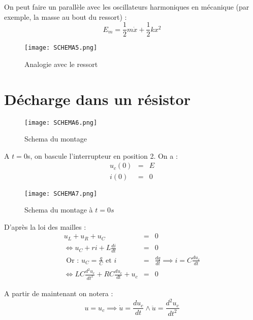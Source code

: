 \begin{remark}
    On peut faire un parallèle avec les oscillateurs harmoniques en mécanique (par exemple, la masse au bout du ressort) : \\
    \[
        E_{m} = \frac{1}{2}m \dot{x} + \frac{1}{2}kx^{2}
    \]
\end{remark}

\begin{figure}[!htb]
    \centering
    \texttt{[image: SCHEMA5.png]}
    \caption{Analogie avec le ressort}
    \label{fig:SCHEMA5}
\end{figure}


\section{Décharge dans un résistor}

\begin{figure}[!htb]
    \centering
    \texttt{[image: SCHEMA6.png]}
    \caption{Schema du montage}
    \label{fig:SCHEMA6}
\end{figure}


A \(t  =0\)s, on bascule l'interrupteur en position 2. On a : 
\begin{eqnarray*}
    u_{c}(0) &=& E \\
    i(0) &=& 0
\end{eqnarray*}

\begin{figure}[!htb]
    \centering
    \texttt{[image: SCHEMA7.png]}
    \caption{Schema du montage à \(t = 0 \unit{s}\) }
    \label{fig:SCHEMA7}
\end{figure}


D'après la loi des mailles : 
\begin{eqnarray*}
    u_{L} + u_{R} + u_{C} &=& 0 \\
    \iff u_{C} + ri + L \frac{di}{dt} &=& 0 \\
    \text{ Or :  } u_{C} = \frac{q}{C} \text{ et } i &=& \frac{dq}{dt} \implies  i = C \frac{du_{c}}{dt} \\
    \iff LC \frac{d^{2}u_{c}}{dt^{2}} + RC \frac{du_{c}}{dt} + u_{c} &=& 0
\end{eqnarray*}

\begin{notation}
    A partir de maintenant on notera : 
    \[
        u = u_{c} \implies \dot{u} = \frac{du_{c}}{dt} \wedge \ddot{u} = \frac{d^{2}u_{c}}{dt^{2}}
    \]
\end{notation}

